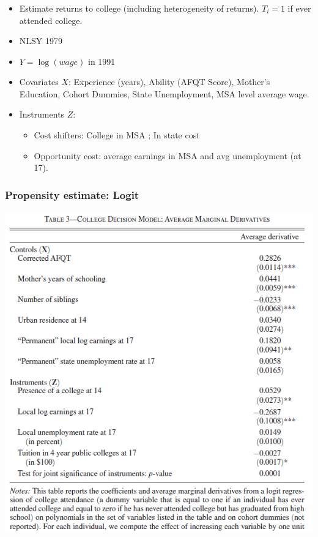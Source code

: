 \begin{frame}
  \frametitle{\cite{carneiro2011estimating}}
  \begin{itemize}
  \item Estimate returns to college (including heterogeneity of returns). $T_i =1$ if ever attended college. 
  \item NLSY 1979
  \item $Y = \log(wage)$ in 1991
  \item Covariates $X$: Experience (years), Ability (AFQT Score), Mother's Education, Cohort Dummies, State Unemployment, MSA level average wage.
  \item Instruments $Z$: 
  \begin{itemize}
    \item Cost shifters: College in MSA ; In state cost
    \item Opportunity cost: average earnings in MSA and avg unemployment (at 17).
  \end{itemize}

  \end{itemize}
\end{frame}

\begin{frame}
  \frametitle{Propensity estimate: Logit}
  \vspace{-10pt}
  \begin{center}
    \includegraphics[width=.9\textwidth]{./resources/CarnieroFirstStage}
  \end{center}  
\end{frame}

